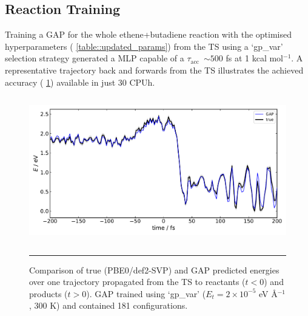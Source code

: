 \documentclass[11pt]{article}
\numberwithin{equation}{subsection}
\newcommand{\kcal}{kcal mol$^{-1}$}
\newcommand{\tacc}{$\tau_\text{acc}$}
\begin{document}
\subsection{Reaction Training}

Training a GAP for the whole ethene+butadiene reaction with the optimised hyperparameters (\tablename{ \ref{table::updated_params}}) from the TS using a `gp\_var' selection strategy generated a MLP capable of a \tacc~$\sim 500$ fs at 1 \kcal. A representative trajectory back and forwards from the TS illustrates the achieved accuracy (\figurename{ \ref{fig::SX22}}) available in just 30 CPUh.


\begin{figure}[h!]
	\centering
	\vspace{0.4cm}
	\includegraphics[height=6.4cm]{figSX22.pdf}
	\vspace{0.1cm}
	\hrule
	\vspace{0.1cm}
	\caption{Comparison of true (PBE0/def2-SVP) and GAP predicted energies over one trajectory propagated from the TS to reactants ($t < 0$) and products ($t > 0$). GAP trained using `gp\_var' ($E_t = 2\times10^{-5}$ eV \AA${}^{-1}$, 300 K) and contained 181 configurations.}
	\label{fig::SX22}
\end{figure}
\end{document}
